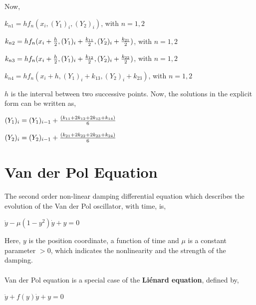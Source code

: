 \documentclass{article}
\begin{document}
Now, 
\begin{center}
$k_{n1}=hf_n(x_i, (Y_1)_i, (Y_2)_i)$, with $n=1, 2$\\ \par
$k_{n2}=hf_n(x_i+{h\over 2}, (Y_1)_i+{k_{11} \over 2}, (Y_2)_i+{k_{21} \over 2})$, with $n=1, 2$\\ \par
$k_{n3}=hf_n(x_i+{h\over 2}, (Y_1)_i+{k_{12} \over 2}, (Y_2)_i+{k_{22} \over 2})$, with $n=1, 2$\\ \par
$k_{n4}=hf_n(x_i+h, (Y_1)_i+k_{13}, (Y_2)_i+k_{23})$, with $n=1, 2$\\ \par
\end{center}
$h$ is the interval between two successive points.
Now, the solutions in the explicit form can be written as, 
\begin{center}
$(Y_1)_i=(Y_1)_{i-1} + {(k_{11}+2k_{12}+2k_{13}+k_{14}) \over 6}$\\ \par
$(Y_2)_i=(Y_2)_{i-1} + {(k_{21}+2k_{22}+2k_{23}+k_{24}) \over 6}$\\ \par
\end{center}
\section{Van der Pol Equation}
The second order non-linear damping differential equation which describes the evolution of the Van der Pol oscillator, with time, is,
\begin{center}
$\ddot{y}-\mu (1-y^2)\dot{y}+y=0$
\end{center}
Here, $y$ is the position coordinate, a function of time and $\mu$ is a constant parameter $>0$, which indicates the nonlinearity and the strength of the damping.\\
\\
Van der Pol equation is a special case of the \textbf{Li\'enard equation}, defined by, 
\begin{center}
$\ddot{y}+f(y)\dot{y}+y=0$
\end{center}
\end{document}
